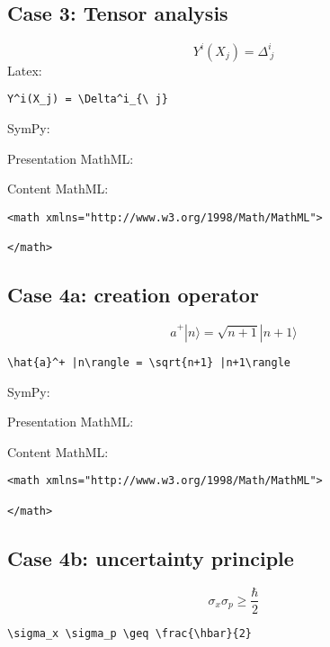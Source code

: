 \subsection{Case 3: Tensor analysis}
\begin{equation}
Y^i(X_j) = \Delta^i_{\ j}
\label{eq:tensor_analysis_case3}
\end{equation}
Latex: 
\begin{verbatim}
Y^i(X_j) = \Delta^i_{\ j}
\end{verbatim}

SymPy:



Presentation MathML:


Content MathML:
\begin{verbatim}
<math xmlns="http://www.w3.org/1998/Math/MathML">

</math>
\end{verbatim}


\subsection{Case 4a: creation operator}
\begin{equation}
\hat{a}^+ |n\rangle = \sqrt{n+1} |n+1\rangle
\label{eq:creation_operator_case4a}
\end{equation}

\begin{verbatim}
\hat{a}^+ |n\rangle = \sqrt{n+1} |n+1\rangle
\end{verbatim}

SymPy:



Presentation MathML:


Content MathML:
\begin{verbatim}
<math xmlns="http://www.w3.org/1998/Math/MathML">

</math>
\end{verbatim}

\subsection{Case 4b: uncertainty principle}
\begin{equation}
\sigma_x \sigma_p \geq \frac{\hbar}{2}
\label{eq:uncertainty_principle_case4b}
\end{equation}

\begin{verbatim}
\sigma_x \sigma_p \geq \frac{\hbar}{2}
\end{verbatim}

